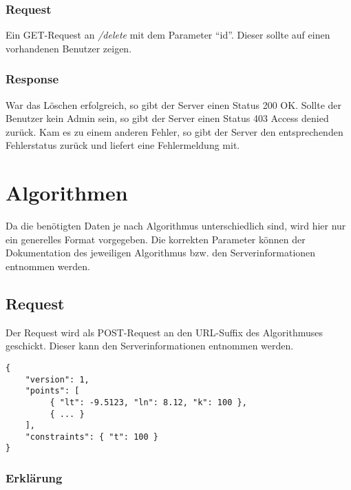 \documentclass[ngerman,titlepage]{scrartcl}
\begin{document}
		\subsubsection*{Request}
		
		Ein GET-Request an \textit{/delete} mit dem Parameter 		"`id"'.
		Dieser sollte auf einen vorhandenen Benutzer zeigen.
		
		\subsubsection*{Response}
		
		War das Löschen erfolgreich, so gibt der Server einen Status 200 OK.
		Sollte der Benutzer kein Admin sein, so gibt der Server einen Status 403 Access denied zurück.
		Kam es zu einem anderen Fehler, so gibt der Server den entsprechenden Fehlerstatus zurück und liefert eine Fehlermeldung mit.
		
   	
\section{Algorithmen}

Da die benötigten Daten je nach Algorithmus unterschiedlich sind, wird hier nur ein generelles Format vorgegeben. Die korrekten Parameter können der Dokumentation des jeweiligen Algorithmus bzw. den Serverinformationen entnommen werden.

	\subsection*{Request}
	
	Der Request wird als POST-Request an den URL-Suffix des Algorithmuses geschickt. Dieser kann den Serverinformationen entnommen werden.
	
	\begin{lstlisting}
{
    "version": 1,
    "points": [
         { "lt": -9.5123, "ln": 8.12, "k": 100 },
         { ... }
    ],
    "constraints": { "t": 100 }
}    	
	\end{lstlisting}
	
		\subsubsection*{Erklärung}
	
\end{document}
